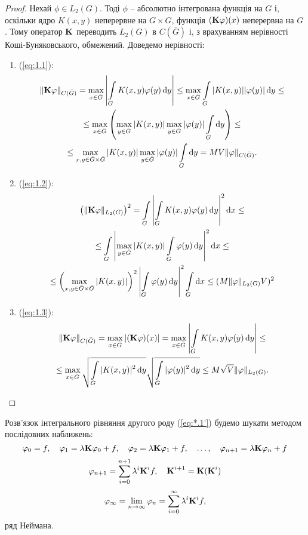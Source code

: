 \begin{proof}
	Нехай $\phi \in L_2(G)$. Тоді $\phi$ -- абсолютно інтегрована функція на $G$ і, оскільки ядро $K(x, y)$ неперервне на $G \times G$, функція $(\bf{K}\phi)(x)$ неперервна на $G$. Тому оператор $\bf{K}$ переводить $L_2(G)$ в $C(\bar G)$ і, з врахуванням нерівності Коші-Буняковського, обмежений. Доведемо нерівності:
	\begin{enumerate}
		\item (\ref{eq:1.1}):
		\begin{multline*}
			\| \bf{K} \phi \|_{C(\bar G)} = \Max_{x \in \bar G} \left| \Int_G K(x, y) \phi(y) \diff y \right| \le \Max_{x \in \bar G} \Int_G |K(x, y)| |\phi(y)| \diff y \le \\
			\le \Max_{x \in \bar G} \left( \Max_{y \in \bar G} |K(x, y)| \Max_{y \in \bar G} |\phi(y)| \Int_G \diff y \right) \le \\
			\le \Max_{x, y \in \bar G \times \bar G} |K(x, y)| \Max_{y \in \bar G} |\phi(y)| \Int_G \diff y = M V \|\phi\|_{C(\bar G)}.
		\end{multline*}
		\item (\ref{eq:1.2}):
		\begin{multline*}
			\left( \| \bf{K} \phi \|_{L_2(G)} \right)^2 = \Int_G \left| \Int_G K(x, y) \phi(y) \diff y \right|^2 \diff x \le \\
			\le \Int_G \left| \Max_{y \in \bar G} |K(x, y)| \Int_G \phi(y) \diff y \right|^2 \diff x \le \\
			\le \left( \Max_{x, y \in \bar G \times \bar G} |K(x, y)| \right)^2 \left| \Int_G \phi(y) \diff y \right|^2 \Int_G \diff x \le (M \| \phi\|_{L_2(G)} V)^2
		\end{multline*}
		\item (\ref{eq:1.3}):
		\begin{multline*}
			\| \bf{K} \phi \|_{C(\bar G)} = \Max_{x \in \bar G} |(\bf{K} \phi) (x)| = \Max_{x \in \bar G} \left| \Int_G K(x, y) \phi(y) \diff y \right| \le \\
			\le \Max_{x \in \bar G} \sqrt{\Int_G |K(x, y)|^2 \diff y} \sqrt{\Int_G |\phi(y)|^2 \diff y} \le M \sqrt{V} \|\phi\|_{L_2(G)}.
		\end{multline*}
	\end{enumerate}
\end{proof}

Розв’язок інтегрального рівняння другого роду (\ref{eq:*.1'}) будемо шукати методом послідовних наближень:
\begin{equation}
	\label{eq:1.10}
	\phi_0 = f, \quad \phi_1 = \lambda \bf{K} \phi_0 + f, \quad \phi_2 = \lambda \bf{K} \phi_1 + f, \quad \ldots, \quad \phi_{n + 1} = \lambda \bf{K} \phi_n + f
\end{equation}
\begin{equation}
	\label{eq:1.11}
	\phi_{n + 1} = \Sum_{i = 0}^{n + 1} \lambda^i \bf{K}^i f, \quad \bf{K}^{i + 1} = \bf{K} (\bf{K}^i)
\end{equation}
\begin{equation}
	\label{eq:1.12}
	\phi_\infty = \Lim_{n \to \infty} \phi_{n} = \Sum_{i = 0}^\infty \lambda^i \bf{K}^i f,
\end{equation}
ряд Неймана. \\

